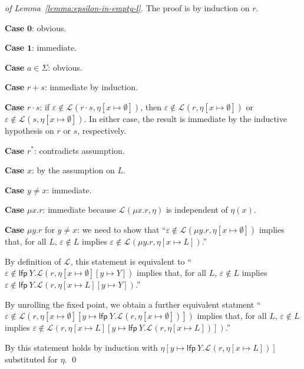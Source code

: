 \documentclass[runningheads, envcountsame, a4paper]{llncs}
\newcommand\LFP{\textsf{lfp}}
\newcommand\Rnull{\mathbf0}
\newcommand\Rempty{\mathbf1}
\newcommand\Lang[1][{}]{\mathcal{L}^{#1}}
\begin{document}
\begin{proof}[of Lemma~\ref{lemma:epsilon-in-empty-l}]
  The proof is by induction on $r$.

  \textbf{Case }$\Rnull$: obvious.

  \textbf{Case }$\Rempty$:  immediate.

  \textbf{Case }$a\in \Sigma$: obvious.

  \textbf{Case }$r+s$: immediate by induction.

  \textbf{Case }$r \cdot s$: if $\varepsilon \notin\Lang (r \cdot s, { \eta[x \mapsto
  \emptyset]})$, then  $\varepsilon \notin\Lang (r, { \eta[x \mapsto
  \emptyset]})$ or  $\varepsilon \notin\Lang (s, { \eta[x \mapsto
  \emptyset]})$. In either case, the result is immediate by the
  inductive hypothesis on $r$ or $s$, respectively.

  \textbf{Case }$r^*$: contradicts assumption.

  \textbf{Case }$x$: by the assumption on $L$.

  \textbf{Case }$y \ne x$: immediate.

  \textbf{Case }$\mu x.r$: immediate because $\Lang (\mu x.r, {\eta})$
  is independent of $\eta(x)$.

  \textbf{Case }$\mu y.r$ for $y\ne x$: we need to show that
  ``$\varepsilon \notin\Lang (\mu y.r, { \eta[x \mapsto
  \emptyset]}) $ implies that, for all $L$,  $\varepsilon \notin L$ implies
  $\varepsilon \notin \Lang (\mu y. r, { \eta[x \mapsto
  L]})$.''

  By definition of $\Lang$, this statement is equivalent to
  ``$\varepsilon \notin\LFP\ Y.\Lang (r, { \eta[x \mapsto
  \emptyset][y \mapsto Y]}) $ implies that, for all $L$,  $\varepsilon \notin L$ implies
  $\varepsilon \notin \LFP\ Y.\Lang ( r, { \eta[x \mapsto
  L][y \mapsto Y]})$.''

  By unrolling the fixed point, we obtain a further equivalent statment
  ``$\varepsilon \notin \Lang (r, { \eta[x \mapsto
  \emptyset][y \mapsto \LFP\ Y.\Lang (r, \eta[x \mapsto
  \emptyset])]}) $ implies that, for all $L$,  $\varepsilon \notin L$ implies
  $\varepsilon \notin \Lang (r, {\eta[x \mapsto
  L][y \mapsto \LFP\ Y.\Lang (r, \eta[x \mapsto
  L])]}) $.''

  By this statement holds by induction with
  $\eta [y \mapsto \LFP\ Y.\Lang (r, { \eta[x \mapsto  L]})]$
  substituted for $\eta$.
  \qed
\end{proof}
\end{document}
